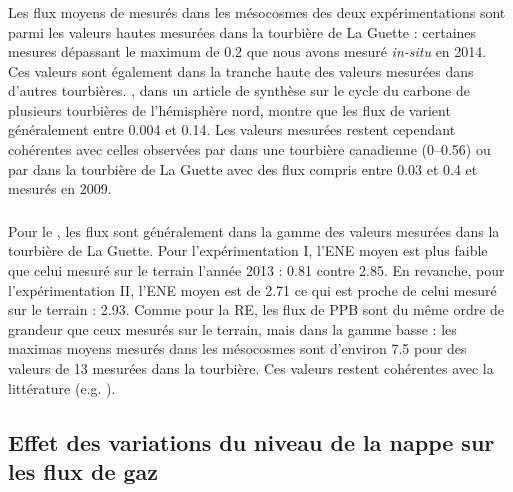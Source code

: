 \subsubsection{\chh}

Les flux moyens de \chh mesurés dans les mésocosmes des deux expérimentations sont parmi les valeurs hautes mesurées dans la tourbière de La Guette : certaines mesures dépassant le maximum de \SI{0.2}{\uml} que nous avons mesuré \textit{in-situ} en 2014.
Ces valeurs sont également dans la tranche haute des valeurs mesurées dans d'autres tourbières.
\citet{blodau2002}, dans un article de synthèse sur le cycle du carbone de plusieurs tourbières de l'hémisphère nord, montre que les flux de \chh varient généralement entre \num{0.004} et \SI{0.14}{\uml}.
Les valeurs mesurées restent cependant cohérentes avec celles observées par \citet{lai2014} dans une tourbière canadienne (\num{0}--\SI{0.56}{\uml}) ou par \citet{gogo2011} dans la tourbière de La Guette avec des flux compris entre \num{0.03} et \SI{0.4}{\uml} et mesurés en 2009.

\subsubsection{\coo}

Pour le \coo, les flux sont généralement dans la gamme des valeurs mesurées dans la tourbière de La Guette.
Pour l'expérimentation I, l'ENE moyen est plus faible que celui mesuré sur le terrain l'année 2013 : \num{0.81} contre \SI{2.85}{\uml}.
En revanche, pour l'expérimentation II, l'ENE moyen est de \SI{2.71}{\uml} ce qui est proche de celui mesuré sur le terrain : \SI{2.93}{\uml}.
Comme pour la RE, les flux de PPB sont du même ordre de grandeur que ceux mesurés sur le terrain, mais dans la gamme basse : les maximas moyens mesurés dans les mésocosmes sont d'environ \num{7.5} pour des valeurs de \SI{13}{\uml} mesurées dans la tourbière.
Ces valeurs restent cohérentes avec la littérature (e.g. \citealp{bortoluzzi2006a}).

%



\subsection{Effet des variations du niveau de la nappe sur les flux de gaz}

